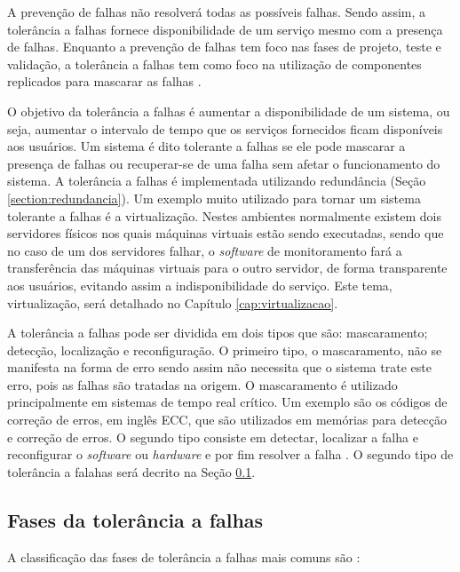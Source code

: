 A prevenção de falhas não resolverá todas as possíveis falhas. Sendo assim, a tolerância a falhas fornece disponibilidade de um serviço 
mesmo com a presença de falhas. Enquanto a prevenção de falhas tem foco nas fases de projeto, teste e validação, a tolerância a falhas 
tem como foco na utilização de componentes replicados para mascarar as falhas \cite{pankaj1994}.

O objetivo da tolerância a falhas é aumentar a disponibilidade de um sistema, ou seja, aumentar o intervalo de tempo que os serviços 
fornecidos ficam disponíveis aos usuários. Um sistema é dito tolerante a falhas se ele pode mascarar a presença de falhas ou recuperar-se 
de uma falha sem afetar o funcionamento do sistema. A tolerância a falhas é implementada utilizando redundância (Seção \ref{section:redundancia}). 
Um exemplo muito utilizado para tornar um sistema tolerante a falhas é a virtualização. Nestes ambientes normalmente existem dois servidores 
físicos nos quais máquinas virtuais estão sendo executadas, sendo que no caso de um dos servidores falhar, o \textit{software} de monitoramento fará a 
transferência das máquinas virtuais para o outro servidor, de forma transparente aos usuários, evitando assim a indisponibilidade do serviço. 
Este tema, virtualização, será detalhado no Capítulo \ref{cap:virtualizacao}.

A tolerância a falhas pode ser dividida em dois tipos que são: mascaramento; detecção, localização e reconfiguração.
O primeiro tipo, o mascaramento, não se manifesta na forma de erro sendo assim não necessita que o sistema trate este erro,
pois as falhas são tratadas na origem. O mascaramento é utilizado principalmente em sistemas de tempo real crítico. 
Um exemplo são os códigos de correção de erros, em inglês \ac{ECC}, que são utilizados em memórias para detecção e correção de erros.
O segundo tipo consiste em detectar, localizar a falha e reconfigurar o \textit{software} ou \textit{hardware} e por fim resolver a 
falha \cite{weber2002}. O segundo tipo de tolerância a falahas será decrito na Seção \ref{section:fasestolerancia}.

\subsection{Fases da tolerância a falhas}
\label{section:fasestolerancia}

A classificação das fases de tolerância a falhas mais comuns são \cite{weber2002}:

